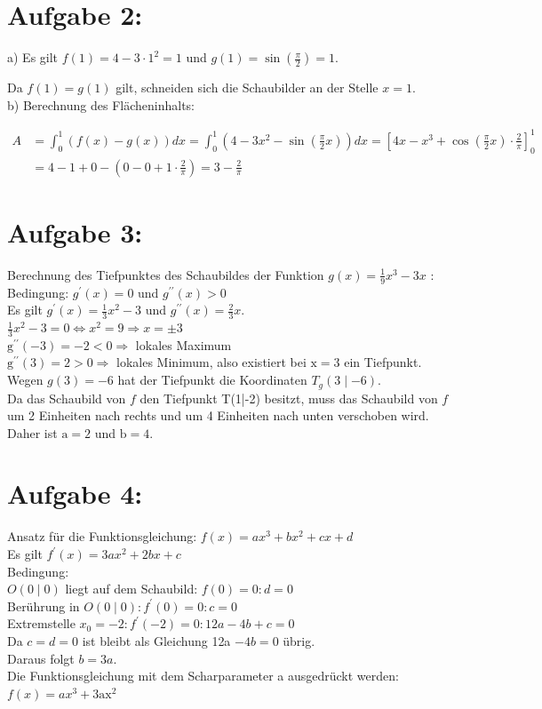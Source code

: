 \documentclass[10pt]{article}
\begin{document}
\section*{Aufgabe 2:}
a) Es gilt $f(1)=4-3 \cdot 1^{2}=1$ und $g(1)=\sin \left(\frac{\pi}{2}\right)=1$.

Da $f(1)=g(1)$ gilt, schneiden sich die Schaubilder an der Stelle $x=1$.\\
b) Berechnung des Flächeninhalts:

$$
\begin{aligned}
A & =\int_{0}^{1}(f(x)-g(x)) d x=\int_{0}^{1}\left(4-3 x^{2}-\sin \left(\frac{\pi}{2} x\right)\right) d x=\left[4 x-x^{3}+\cos \left(\frac{\pi}{2} x\right) \cdot \frac{2}{\pi}\right]_{0}^{1} \\
& =4-1+0-\left(0-0+1 \cdot \frac{2}{\pi}\right)=3-\frac{2}{\pi}
\end{aligned}
$$

\section*{Aufgabe 3:}
Berechnung des Tiefpunktes des Schaubildes der Funktion $g(x)=\frac{1}{9} x^{3}-3 x$ :\\
Bedingung: $g^{\prime}(x)=0$ und $g^{\prime \prime}(x)>0$\\
Es gilt $g^{\prime}(x)=\frac{1}{3} x^{2}-3$ und $g^{\prime \prime}(x)=\frac{2}{3} x$.\\
$\frac{1}{3} x^{2}-3=0 \Leftrightarrow x^{2}=9 \Rightarrow x= \pm 3$\\
$\mathrm{g}^{\prime \prime}(-3)=-2<0 \Rightarrow$ lokales Maximum\\
$\mathrm{g}^{\prime \prime}(3)=2>0 \Rightarrow$ lokales Minimum, also existiert bei $\mathrm{x}=3$ ein Tiefpunkt.\\
Wegen $g(3)=-6$ hat der Tiefpunkt die Koordinaten $T_{g}(3 \mid-6)$.\\
Da das Schaubild von $f$ den Tiefpunkt T(1|-2) besitzt, muss das Schaubild von $f$ um 2 Einheiten nach rechts und um 4 Einheiten nach unten verschoben wird.\\
Daher ist $\mathrm{a}=2$ und $\mathrm{b}=4$.

\section*{Aufgabe 4:}
Ansatz für die Funktionsgleichung: $f(x)=a x^{3}+b x^{2}+c x+d$\\
Es gilt $f^{\prime}(x)=3 a x^{2}+2 b x+c$\\
Bedingung:\\
$O(0 \mid 0)$ liegt auf dem Schaubild: $f(0)=0: d=0$\\
Berührung in $O(0 \mid 0): f^{\prime}(0)=0: c=0$\\
Extremstelle $x_{0}=-2: f^{\prime}(-2)=0: 12 a-4 b+c=0$\\
Da $c=d=0$ ist bleibt als Gleichung 12a $-4 b=0$ übrig.\\
Daraus folgt $b=3 a$.\\
Die Funktionsgleichung mit dem Scharparameter a ausgedrückt werden: $f(x)=a x^{3}+3 \mathrm{ax}^{2}$
\end{document}
